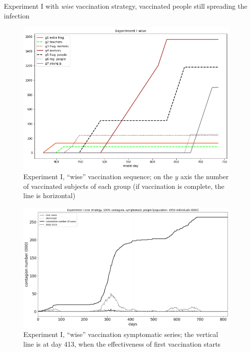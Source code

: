 \documentclass[8pt]{beamer}
\begin{document}
\begin{frame}{Experiment I with \emph{wise} vaccination strategy, vaccinated people still spreading the infection}

\begin{figure}[H]
\center
\includegraphics[scale=0.14]{Experiment_I_wiseVaccinationSequence.png} %

\caption{Experiment I, ``wise'' vaccination sequence; on the $y$ axis the number of vaccinated subjects of each group (if vaccination is complete, the line is horizontal)} 
\label{Experiment_I_wiseVaccinationSequence}
\end{figure}

\begin{figure}[H]
\center
\includegraphics[scale=0.16]{Experiment_I_1_wise_symptomatic_series.png} 

\caption{Experiment I, ``wise'' vaccination symptomatic series; the vertical line is at day 413, when the effectiveness of first vaccination starts} 
\label{Experiment_I_wiseSymptomaticSeries}
\end{figure}



\end{frame}
\end{document}
